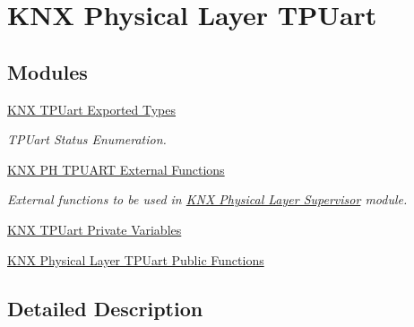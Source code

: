 \hypertarget{group___k_n_x___p_h___t_p_uart}{}\section{K\+NX Physical Layer T\+P\+Uart}
\label{group___k_n_x___p_h___t_p_uart}
\subsection*{Modules}
\begin{DoxyCompactItemize}
\item 
\hyperlink{group___k_n_x___t_p_uart___exported___types}{K\+N\+X T\+P\+Uart Exported Types}
\begin{DoxyCompactList}\small\item\em T\+P\+Uart Status Enumeration. \end{DoxyCompactList}\item 
\hyperlink{group___k_n_x___p_h___t_p_uart___external___functions}{K\+N\+X P\+H T\+P\+U\+A\+R\+T External Functions}
\begin{DoxyCompactList}\small\item\em External functions to be used in \hyperlink{group___k_n_x___p_h___sup}{K\+NX Physical Layer Supervisor} module. \end{DoxyCompactList}\item 
\hyperlink{group___k_n_x___p_h___t_p_u_a_r_t___private___variables}{K\+N\+X T\+P\+Uart Private Variables}
\item 
\hyperlink{group___k_n_x___p_h___t_p_uart___exported___functions}{K\+N\+X Physical Layer T\+P\+Uart Public Functions}
\end{DoxyCompactItemize}


\subsection{Detailed Description}
